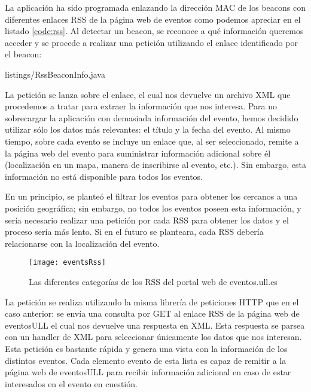 La aplicación ha sido programada enlazando la dirección MAC de los beacons con diferentes enlaces RSS de la página web de eventos como podemos apreciar en el listado \ref{code:rss}. Al detectar un beacon, se reconoce a qué información queremos acceder y se procede a realizar una petición utilizando el enlace identificado por el beacon: 


{listings/RssBeaconInfo.java} %

La petición se lanza sobre el enlace, el cual nos devuelve un archivo XML que procedemos a tratar para extraer la información que nos interesa. Para no sobrecargar la aplicación con demasiada información del evento, hemos decidido utilizar sólo los datos más relevantes: el título y la fecha del evento. Al mismo tiempo, sobre cada evento se incluye un enlace que, al ser seleccionado, remite a la página web del evento para suministrar información adicional sobre él (localización en un mapa, manera de inscribirse al evento, etc.). Sin embargo, esta información no está disponible para todos los eventos.


En un principio, se planteó el filtrar los eventos para obtener los cercanos a una posición geográfica; sin embargo, no todos los eventos poseen esta información, y sería necesario realizar una petición por cada RSS para obtener los datos y el proceso sería más lento. Si en el futuro se planteara, cada RSS debería relacionarse con la localización del evento.

\begin{figure}[H]
	\centering
	\texttt{[image: eventsRss]}
	\caption{Las diferentes categorías de los RSS del portal web de eventos.ull.es}
	\label{fig:eventsRss}
\end{figure}


La petición se realiza utilizando la misma librería de peticiones HTTP que en el caso anterior: se envía una consulta por GET al enlace RSS de la página web de eventosULL el cual nos devuelve una respuesta en XML. Esta respuesta se parsea con un handler de XML para seleccionar únicamente los datos que nos interesan. Esta petición es bastante rápida y genera una vista con la información de los distintos eventos. Cada elemento evento de esta lista es capaz de remitir a la página web de eventosULL para recibir información adicional en caso de estar interesados en el evento en cuestión.

